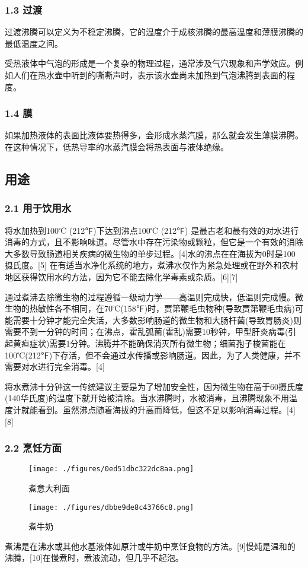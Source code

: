 \subsubsection{1.3 过渡}
过渡沸腾可以定义为不稳定沸腾，它的温度介于成核沸腾的最高温度和薄膜沸腾的最低温度之间。

受热液体中气泡的形成是一个复杂的物理过程，通常涉及气穴现象和声学效应。例如人们在热水壶中听到的嘶嘶声时，表示该水壶尚未加热到气泡沸腾到表面的程度。

\subsubsection{1.4 膜}
如果加热液体的表面比液体要热得多，会形成水蒸汽膜，那么就会发生薄膜沸腾。在这种情况下，低热导率的水蒸汽膜会将热表面与液体绝缘。

\subsection{用途}
\subsubsection{2.1 用于饮用水}
将水加热到100℃ (212℉)下达到沸点100℃ (212℉) 是最古老和最有效的对水进行消毒的方式，且不影响味道。尽管水中存在污染物或颗粒，但它是一个有效的消除大多数导致肠道相关疾病的微生物的单步过程。[4]水的沸点在在海拔为0时是100摄氏度。[5] 在有适当水净化系统的地方，煮沸水仅作为紧急处理或在野外和农村地区获得饮用水的方法，因为它不能去除化学毒素或杂质。[6][7]

通过煮沸去除微生物的过程遵循一级动力学——高温则完成快，低温则完成慢。微生物的热敏性各不相同，在70℃(158℉)时，贾第鞭毛虫物种(导致贾第鞭毛虫病)可能需要十分钟才能完全失活，大多数影响肠道的微生物和大肠杆菌(导致胃肠炎)则需要不到一分钟的时间；在沸点，霍乱弧菌(霍乱)需要10秒钟，甲型肝炎病毒(引起黄疸症状)需要1分钟。沸腾并不能确保消灭所有微生物；细菌孢子梭菌能在100℃(212℉)下存活，但不会通过水传播或影响肠道。因此，为了人类健康，并不需要对水进行完全消毒。[4]

将水煮沸十分钟这一传统建议主要是为了增加安全性，因为微生物在高于60摄氏度(140华氏度)的温度下就开始被清除。当水沸腾时，水被消毒，且沸腾现象不用温度计就能看到。虽然沸点随着海拔的升高而降低，但这不足以影响消毒过程。[4][8]

\subsubsection{2.2 烹饪方面}
\begin{figure}[ht]
\centering
\texttt{[image: ./figures/0ed51dbc322dc8aa.png]}
\caption{煮意大利面} \label{fig_FT_2}
\end{figure}
\begin{figure}[ht]
\centering
\texttt{[image: ./figures/dbbe9de8c43766c8.png]}
\caption{煮牛奶} \label{fig_FT_3}
\end{figure}
煮沸是在沸水或其他水基液体如原汁或牛奶中烹饪食物的方法。[9]慢炖是温和的沸腾，[10]在慢煮时，煮液流动，但几乎不起泡。

